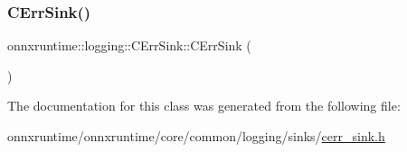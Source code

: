 \subsubsection{\texorpdfstring{C\+Err\+Sink()}{CErrSink()}}
{\footnotesize\ttfamily onnxruntime\+::logging\+::\+C\+Err\+Sink\+::\+C\+Err\+Sink (\begin{DoxyParamCaption}{ }\end{DoxyParamCaption})\hspace{0.3cm}{\ttfamily [inline]}}



The documentation for this class was generated from the following file\+:\begin{DoxyCompactItemize}
\item 
onnxruntime/onnxruntime/core/common/logging/sinks/\mbox{\hyperlink{cerr__sink_8h}{cerr\+\_\+sink.\+h}}\end{DoxyCompactItemize}
